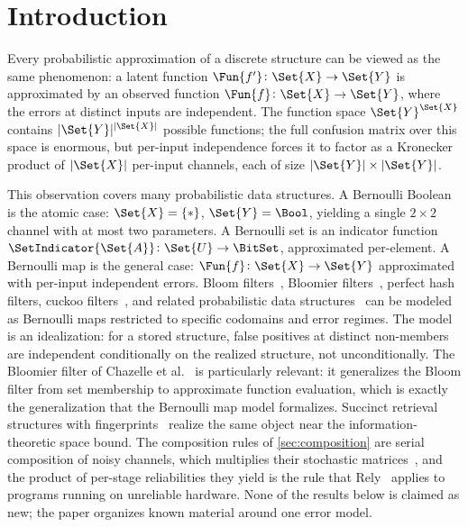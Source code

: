 \documentclass[ ../main.tex]{subfiles}
\begin{document}
\section{Introduction}
\label{sec:intro}

Every probabilistic approximation of a discrete structure can be viewed as the same phenomenon: a latent function $\Fun{f'} \colon \Set{X} \to \Set{Y}$ is approximated by an observed function $\Fun{f} \colon \Set{X} \to \Set{Y}$, where the errors at distinct inputs are independent.
The function space $\Set{Y}^{\Set{X}}$ contains $|\Set{Y}|^{|\Set{X}|}$ possible functions; the full confusion matrix over this space is enormous, but per-input independence forces it to factor as a Kronecker product of $|\Set{X}|$ per-input channels, each of size $|\Set{Y}| \times |\Set{Y}|$.

This observation covers many probabilistic data structures.
A Bernoulli Boolean is the atomic case: $\Set{X} = \{*\}$, $\Set{Y} = \Bool$, yielding a single $2 \times 2$ channel with at most two parameters.
A Bernoulli set is an indicator function $\SetIndicator{\Set{A}} \colon \Set{U} \to \BitSet$, approximated per-element.
A Bernoulli map is the general case: $\Fun{f} \colon \Set{X} \to \Set{Y}$ approximated with per-input independent errors.
Bloom filters~\cite{bloom1970}, Bloomier filters~\cite{chazelle2004}, perfect hash filters, cuckoo filters~\cite{fan2014}, and related probabilistic data structures~\cite{broderMitzenmacher2004} can be modeled as Bernoulli maps restricted to specific codomains and error regimes. The model is an idealization: for a stored structure, false positives at distinct non-members are independent conditionally on the realized structure, not unconditionally.
The Bloomier filter of Chazelle et al.~\cite{chazelle2004} is particularly relevant: it generalizes the Bloom filter from set membership to approximate function evaluation, which is exactly the generalization that the Bernoulli map model formalizes. Succinct retrieval structures with fingerprints~\cite{dietzfelbinger2008} realize the same object near the information-theoretic space bound. The composition rules of \cref{sec:composition} are serial composition of noisy channels, which multiplies their stochastic matrices~\cite{silverman1955,cover2006}, and the product of per-stage reliabilities they yield is the rule that Rely~\cite{carbin2013rely} applies to programs running on unreliable hardware. None of the results below is claimed as new; the paper organizes known material around one error model.
\end{document}
